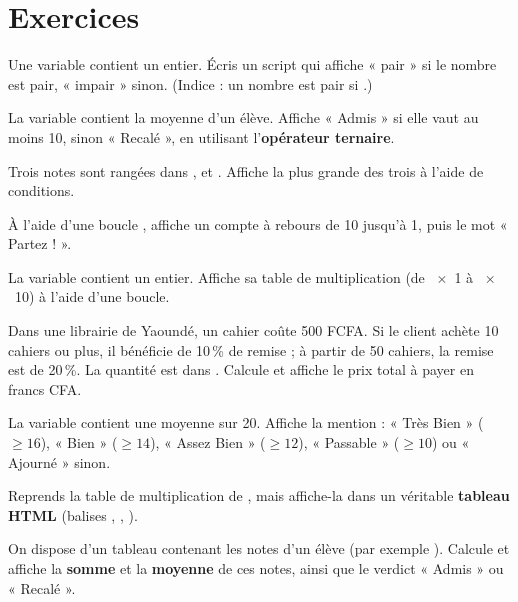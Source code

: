 \section{Exercices}


Une variable  contient un entier. Écris un script qui affiche
« pair » si le nombre est pair, « impair » sinon. (Indice : un nombre est pair si
.)

La variable  contient la moyenne d'un élève. Affiche « Admis » si
elle vaut au moins 10, sinon « Recalé », en utilisant l'\textbf{opérateur ternaire}.

Trois notes sont rangées dans ,  et . Affiche la plus
grande des trois à l'aide de conditions.

À l'aide d'une boucle , affiche un compte à rebours de 10 jusqu'à 1, puis
le mot « Partez ! ».

La variable  contient un entier. Affiche sa table de multiplication
(de ~$\times$~1 à ~$\times$~10) à l'aide d'une boucle.


Dans une librairie de Yaoundé, un cahier coûte 500 FCFA. Si le client achète 10
cahiers ou plus, il bénéficie de 10\,\% de remise ; à partir de 50 cahiers, la
remise est de 20\,\%. La quantité est dans . Calcule et affiche le prix
total à payer en francs CFA.

La variable  contient une moyenne sur 20. Affiche la mention :
« Très Bien » ($\geq 16$), « Bien » ($\geq 14$), « Assez Bien » ($\geq 12$),
« Passable » ($\geq 10$) ou « Ajourné » sinon.

Reprends la table de multiplication de , mais affiche-la dans un véritable
\textbf{tableau HTML} (balises , , ).

On dispose d'un tableau  contenant les notes d'un élève (par exemple
\code{[12, 15, 8, 14, 16]}). Calcule et affiche la \textbf{somme} et la
\textbf{moyenne} de ces notes, ainsi que le verdict « Admis » ou « Recalé ».

